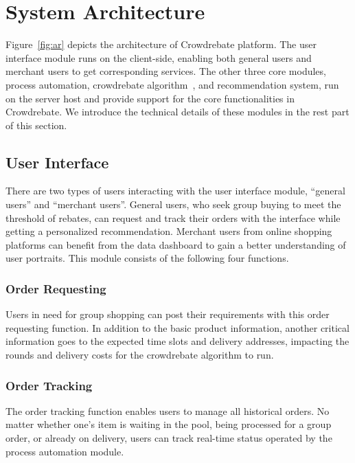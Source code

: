 \section{System Architecture}

Figure~\ref{fig:ar} depicts the architecture of Crowdrebate platform. The user interface module runs on the client-side, enabling both general users and merchant users to get corresponding services. The other three core modules, process automation, crowdrebate algorithm~\cite{Report}, and recommendation system, run on the server host and provide support for the core functionalities in Crowdrebate. We introduce the technical details of these modules in the rest part of this section.

\subsection{User Interface}

There are two types of users interacting with the user interface module, ``general users'' and ``merchant users''. General users, who seek group buying to meet the threshold of rebates, can request and track their orders with the interface while getting a personalized recommendation. Merchant users from online shopping platforms can benefit from the data dashboard to gain a better understanding of user portraits. This module consists of the following four functions.

\subsubsection{Order Requesting}

Users in need for group shopping can post their requirements with this order requesting function. In addition to the basic product information, another critical information goes to the expected time slots and delivery addresses, impacting the rounds and delivery costs for the crowdrebate algorithm to run.

\subsubsection{Order Tracking}

The order tracking function enables users to manage all historical orders. No matter whether one’s item is waiting in the pool, being processed for a group order, or already on delivery, users can track real-time status operated by the process automation module.
	
